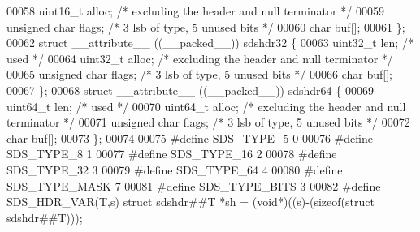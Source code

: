 \begin{DoxyCode}
00058     uint16\_t alloc; \textcolor{comment}{/* excluding the header and null terminator */}
00059     \textcolor{keywordtype}{unsigned} \textcolor{keywordtype}{char} flags; \textcolor{comment}{/* 3 lsb of type, 5 unused bits */}
00060     \textcolor{keywordtype}{char} buf[];
00061 \};
00062 \textcolor{keyword}{struct} \textcolor{keyword}{\_\_attribute\_\_} ((\_\_packed\_\_)) sdshdr32 \{
00063     uint32\_t len; \textcolor{comment}{/* used */}
00064     uint32\_t alloc; \textcolor{comment}{/* excluding the header and null terminator */}
00065     \textcolor{keywordtype}{unsigned} \textcolor{keywordtype}{char} flags; \textcolor{comment}{/* 3 lsb of type, 5 unused bits */}
00066     \textcolor{keywordtype}{char} buf[];
00067 \};
00068 \textcolor{keyword}{struct} \textcolor{keyword}{\_\_attribute\_\_} ((\_\_packed\_\_)) sdshdr64 \{
00069     uint64\_t len; \textcolor{comment}{/* used */}
00070     uint64\_t alloc; \textcolor{comment}{/* excluding the header and null terminator */}
00071     \textcolor{keywordtype}{unsigned} \textcolor{keywordtype}{char} flags; \textcolor{comment}{/* 3 lsb of type, 5 unused bits */}
00072     \textcolor{keywordtype}{char} buf[];
00073 \};
00074 
00075 \textcolor{preprocessor}{#}\textcolor{preprocessor}{define} \textcolor{preprocessor}{SDS\_TYPE\_5}  0
00076 \textcolor{preprocessor}{#}\textcolor{preprocessor}{define} \textcolor{preprocessor}{SDS\_TYPE\_8}  1
00077 \textcolor{preprocessor}{#}\textcolor{preprocessor}{define} \textcolor{preprocessor}{SDS\_TYPE\_16} 2
00078 \textcolor{preprocessor}{#}\textcolor{preprocessor}{define} \textcolor{preprocessor}{SDS\_TYPE\_32} 3
00079 \textcolor{preprocessor}{#}\textcolor{preprocessor}{define} \textcolor{preprocessor}{SDS\_TYPE\_64} 4
00080 \textcolor{preprocessor}{#}\textcolor{preprocessor}{define} \textcolor{preprocessor}{SDS\_TYPE\_MASK} 7
00081 \textcolor{preprocessor}{#}\textcolor{preprocessor}{define} \textcolor{preprocessor}{SDS\_TYPE\_BITS} 3
00082 \textcolor{preprocessor}{#}\textcolor{preprocessor}{define} \textcolor{preprocessor}{SDS\_HDR\_VAR}\textcolor{preprocessor}{(}\textcolor{preprocessor}{T}\textcolor{preprocessor}{,}\textcolor{preprocessor}{s}\textcolor{preprocessor}{)} \textcolor{keyword}{struct} \textcolor{preprocessor}{sdshdr}\textcolor{preprocessor}{##}\textcolor{preprocessor}{T} \textcolor{preprocessor}{*}\textcolor{preprocessor}{sh} \textcolor{preprocessor}{=} \textcolor{preprocessor}{(}\textcolor{keywordtype}{void}\textcolor{preprocessor}{*}\textcolor{preprocessor}{)}\textcolor{preprocessor}{(}\textcolor{preprocessor}{(}\textcolor{preprocessor}{s}\textcolor{preprocessor}{)}\textcolor{preprocessor}{-}\textcolor{preprocessor}{(}\textcolor{keyword}{sizeof}\textcolor{preprocessor}{(}\textcolor{keyword}{struct} \textcolor{preprocessor}{sdshdr}\textcolor{preprocessor}{##}\textcolor{preprocessor}{T}\textcolor{preprocessor}{)}\textcolor{preprocessor}{)}\textcolor{preprocessor}{)}\textcolor{preprocessor}{;}

\end{DoxyCode}
